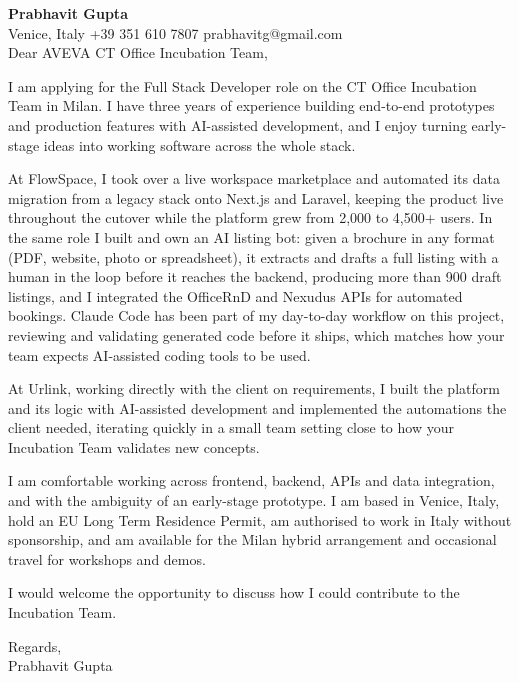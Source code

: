 \documentclass[a4paper,10.5pt]{article}
\begin{document}
\textbf{Prabhavit Gupta}\\
Venice, Italy \textbar{} +39 351 610 7807 \textbar{} prabhavitg@gmail.com\\[10pt]
Dear AVEVA CT Office Incubation Team,

I am applying for the Full Stack Developer role on the CT Office Incubation Team in Milan. I have three years of experience building end-to-end prototypes and production features with AI-assisted development, and I enjoy turning early-stage ideas into working software across the whole stack.

At FlowSpace, I took over a live workspace marketplace and automated its data migration from a legacy stack onto Next.js and Laravel, keeping the product live throughout the cutover while the platform grew from 2,000 to 4,500+ users. In the same role I built and own an AI listing bot: given a brochure in any format (PDF, website, photo or spreadsheet), it extracts and drafts a full listing with a human in the loop before it reaches the backend, producing more than 900 draft listings, and I integrated the OfficeRnD and Nexudus APIs for automated bookings. Claude Code has been part of my day-to-day workflow on this project, reviewing and validating generated code before it ships, which matches how your team expects AI-assisted coding tools to be used.

At Urlink, working directly with the client on requirements, I built the platform and its logic with AI-assisted development and implemented the automations the client needed, iterating quickly in a small team setting close to how your Incubation Team validates new concepts.

I am comfortable working across frontend, backend, APIs and data integration, and with the ambiguity of an early-stage prototype. I am based in Venice, Italy, hold an EU Long Term Residence Permit, am authorised to work in Italy without sponsorship, and am available for the Milan hybrid arrangement and occasional travel for workshops and demos.

I would welcome the opportunity to discuss how I could contribute to the Incubation Team.

Regards,\\
Prabhavit Gupta
\end{document}
